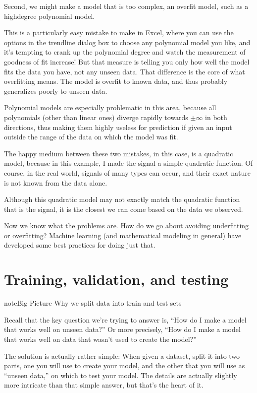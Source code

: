 \documentclass[letterpaper,10pt,english]{sphinxmanual}
\begin{document}
Second, we might make a model that is too complex, an overfit model, such as a high\sphinxhyphen{}degree polynomial model.


This is a particularly easy mistake to make in Excel, where you can use the options in the trendline dialog box to choose any polynomial model you like, and it’s tempting to crank up the polynomial degree and watch the measurement of goodness of fit increase!  But that measure is telling you only how well the model fits the data you have, not any unseen data.  That difference is the core of what overfitting means.  The model is overfit to known data, and thus probably generalizes poorly to unseen data.

Polynomial models are especially problematic in this area, because all polynomials (other than linear ones) diverge rapidly towards \(\pm\infty\) in both directions, thus making them highly useless for prediction if given an input outside the range of the data on which the model was fit.

The happy medium between these two mistakes, in this case, is a quadratic model, because in this example, I made the signal a simple quadratic function.  Of course, in the real world, signals of many types can occur, and their exact nature is not known from the data alone.


Although this quadratic model may not exactly match the quadratic function that is the signal, it is the closest we can come based on the data we observed.

Now we know what the problems are.  How do we go about avoiding underfitting or overfitting?  Machine learning (and mathematical modeling in general) have developed some best practices for doing just that.


\section{Training, validation, and testing}
\label{\detokenize{chapter-17-machine-learning:training-validation-and-testing}}
\begin{sphinxadmonition}{note}{Big Picture \sphinxhyphen{} Why we split data into train and test sets}

Recall that the key question we’re trying to answer is, “How do I make a model that works well on unseen data?”  Or more precisely, “How do I make a model that works well on data that wasn’t used to create the model?”

The solution is actually rather simple:  When given a dataset, split it into two parts, one you will use to create your model, and the other that you will use as “unseen data,” on which to test your model.  The details are actually slightly more intricate than that simple answer, but that’s the heart of it.
\end{sphinxadmonition}
\end{document}
